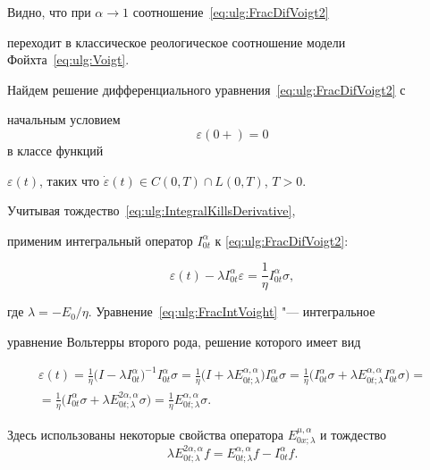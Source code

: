 Видно, что при $\alpha\rightarrow 1$ соотношение~\eqref{eq:ulg:FracDifVoigt2}

переходит в классическое реологическое соотношение модели Фойхта~\eqref{eq:ulg:Voigt}.



Найдем решение дифференциального уравнения~\eqref{eq:ulg:FracDifVoigt2} с

начальным условием $$\varepsilon(0+)=0$$ в классе функций

$\varepsilon(t)$, таких что $\dot{\varepsilon}(t)\in C(0,T)\cap L(0,T)$, $ T>0$.

Учитывая тождество~\eqref{eq:ulg:IntegralKillsDerivative}, 

применим интегральный оператор $I_{0t}^{\alpha}$ к \eqref{eq:ulg:FracDifVoigt2}:

\begin{equation}\label{eq:ulg:FracIntVoight}

\varepsilon(t)-\lambda

I_{0t}^{\alpha}\varepsilon=\frac{1}{\eta}I_{0t}^{\alpha}\sigma,

\end{equation}

где $\lambda=-E_{0}/\eta$. Уравнение~\eqref{eq:ulg:FracIntVoight} "--- интегральное

уравнение Вольтерры второго рода,  решение которого имеет вид

\begin{multline}\label{eq:ulg:FracVoightSolution1}

\varepsilon(t)=\frac{1}{\eta} 

\bigl(I-\lambda I_{0t}^{\alpha}\bigr)^{-1}I_{0t}^{\alpha}\sigma=\frac{1}{\eta}

\bigl(I+\lambda E_{0t;\lambda}^{\alpha,\alpha}\bigr)I_{0t}^{\alpha}\sigma=

\frac{1}{\eta}

\bigl(I_{0t}^{\alpha}\sigma+\lambda E_{0t;\lambda}^{\alpha,\alpha}I_{0t}^{\alpha}\sigma\bigr)=\\

=\frac{1}{\eta}\bigl(I_{0t}^{\alpha}\sigma+\lambda E_{0t;\lambda}^{2\alpha,\alpha}\sigma\bigr)=\frac{1}{\eta}E_{0t;\lambda}^{\alpha,\alpha}\sigma.

\end{multline}

Здесь использованы некоторые свойства оператора $E^{\mu,\alpha}_{0x;\lambda}$ и тождество \cite{ulg:bib:ORY_reology_models} $$\lambda E_{0t;\lambda}^{2\alpha,\alpha}f=E_{0t;\lambda}^{\alpha,\alpha}f-I_{0t}^{\alpha}f .$$



